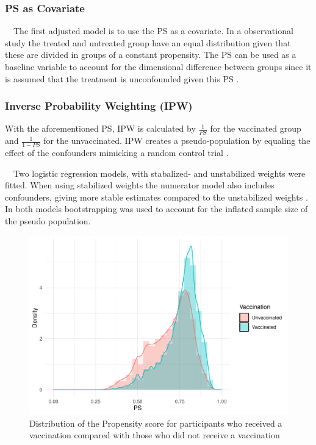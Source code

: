 \documentclass[
]{article}
\begin{document}
\hypertarget{ps-as-covariate}{%
\subsubsection{PS as Covariate}\label{ps-as-covariate}}

~~The first adjusted model is to use the PS as a covariate. In a observational study the treated and untreated group have an equal distribution given that these are divided in groups of a constant propensity. The PS can be used as a baseline variable to account for the dimensional difference between groups since it is assumed that the treatment is unconfounded given this PS \citep{schafer}.

\hypertarget{inverse-probability-weighting-ipw}{%
\subsubsection{Inverse Probability Weighting (IPW)}\label{inverse-probability-weighting-ipw}}

With the aforementioned PS, IPW is calculated by \(\frac{1}{PS}\) for the vaccinated group and \(\frac{1}{1-PS}\) for the unvaccinated. IPW creates a pseudo-population by equaling the effect of the confounders mimicking a random control trial \citep{shiba}.

~~Two logistic regression models, with stabalized- and unstabilized weights were fitted. When using stabilized weights the numerator model also includes confounders, giving more stable estimates compared to the unstabilized weights \citep{ipw}. In both models bootstrapping was used to account for the inflated sample size of the pseudo population.

\begin{figure}
\includegraphics[width=0.7\linewidth]{Assignment_files/figure-latex/psscore-1} \caption{Distribution of the Propensity score for participants who received a vaccination compared with those who did not receive a vaccination}\label{fig:psscore}
\end{figure}
\end{document}
